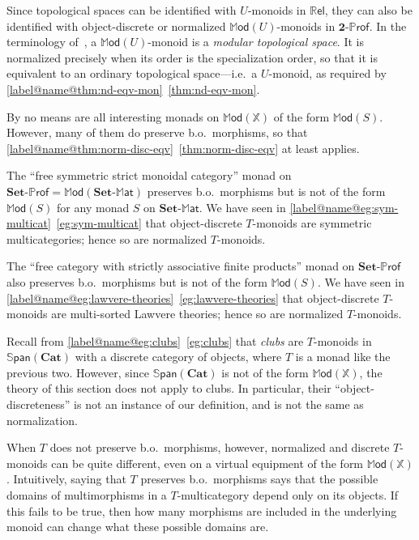 \documentclass{tac}
\makeatletter
\newcommand{\mb}[1]{{\mathbf{#1}}}
\newcommand{\MAT}[1]{\mathbf{#1}\mbox{-}\mathbb{M}\mathsf{at}}
\newcommand{\PROF}[1]{\mathbf{#1}\mbox{-}\mathbb{P}\mathsf{rof}}
\newcommand{\SPAN}[1]{\mathbb{S}\mathsf{pan}\!\left(\mb{#1}\right)}
\newcommand{\Mod}{\ensuremath{\mathbb{M}\mathsf{od}}}
\newcommand{\Rel}{\mathbb{R}\mathsf{el}}
\numberwithin{equation}{section}
\def\currthmtype{}
\def\autoref#1{\ref*{label@name@#1}~\ref{#1}}
\def\autoref#1{\ref{label@name@#1}~\ref{#1}}
\let\old@label\label
\def\label#1{%
    {\let\your@currentlabel\@currentlabel%
      \edef\@currentlabel{\currthmtype}%
      \old@label{label@name@#1}}%
    \old@label{#1}}
\makeatother
\begin{document}
\begin{example}\label{eg:modular}
  Since topological spaces can be identified with $U$-monoids in
  $\Rel$, they can also be identified with object-discrete or
  normalized $\Mod(U)$-monoids in $\PROF{2}$.  In the terminology
  of~\cite{tholen:ordered-topstruct}, a $\Mod(U)$-monoid is a
  \emph{modular topological space}.  It is normalized precisely when
  its order is the specialization order, so that it is equivalent to
  an ordinary topological space---i.e.\ a $U$-monoid, as required by
  \autoref{thm:nd-eqv-mon}.
\end{example}

By no means are all interesting monads on $\Mod(\mathbb{X})$ of the
form $\Mod(S)$.  However, many of them do preserve b.o.\ morphisms, so
that \autoref{thm:norm-disc-eqv} at least applies.

\begin{example}
  The ``free symmetric strict monoidal category'' monad on $\PROF{Set}
  = \Mod(\MAT{Set})$ preserves b.o.\ morphisms but is not of the form
  $\Mod(S)$ for any monad $S$ on $\MAT{Set}$.  We have seen in
  \autoref{eg:sym-multicat} that object-discrete $T$-monoids are symmetric
  multicategories; hence so are normalized $T$-monoids.
\end{example}

\begin{example}\label{eg:lawvere-theories-2}
  The ``free category with strictly associative finite products''
  monad on $\PROF{Set}$ also preserves b.o.\ morphisms but is not of
  the form $\Mod(S)$.  We have seen in
  \autoref{eg:lawvere-theories} that object-discrete $T$-monoids are
  multi-sorted Lawvere theories; hence so are normalized $T$-monoids.
\end{example}

\begin{nonexample}
  Recall from \autoref{eg:clubs} that \emph{clubs} are $T$-monoids
  in $\SPAN{Cat}$ with a discrete category of objects, where $T$ is a
  monad like the previous two.  However, since $\SPAN{Cat}$ is not
  of the form $\Mod(\mathbb{X})$, the theory of this section does not
  apply to clubs.  In particular, their ``object-discreteness'' is not
  an instance of our definition, and is not the same as normalization.
\end{nonexample}

When $T$ does not preserve b.o.\ morphisms, however, normalized and
discrete $T$-monoids can be quite different, even on a virtual
equipment of the form $\Mod(\mathbb{X})$.  Intuitively, saying that
$T$ preserves b.o.\ morphisms says that the possible domains of
multimorphisms in a $T$-multicategory depend only on its objects.  If
this fails to be true, then how many morphisms are included in the
underlying monoid can change what these possible domains are.
\end{document}
